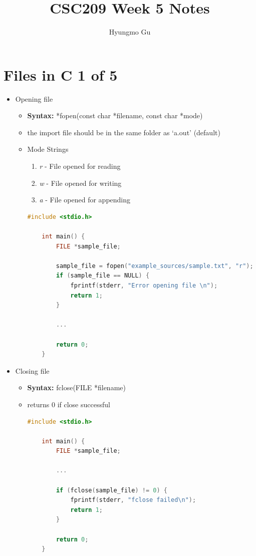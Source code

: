 \documentclass[12pt]{article}
\begin{document}
\title{CSC209 Week 5 Notes}
\author{Hyungmo Gu}
\maketitle

\section*{Files in C 1 of 5}

\bigskip

\begin{itemize}
    \item Opening file
    \begin{itemize}
        \item \textbf{Syntax:} *fopen(const char *filename, const char *mode)
        \item the import file should be in the same folder as `a.out' (default)
        \item Mode Strings
        \begin{enumerate}[1.]
            \item \textit{r} - File opened for reading
            \item \textit{w} - File opened for writing
            \item \textit{a} - File opened for appending
        \end{enumerate}

    \begin{lstlisting}[language=c]
    #include <stdio.h>

    int main() {
        FILE *sample_file;

        sample_file = fopen("example_sources/sample.txt", "r");
        if (sample_file == NULL) {
            fprintf(stderr, "Error opening file \n");
            return 1;
        }

        ...

        return 0;
    }
    \end{lstlisting}
    \end{itemize}
    \item Closing file
    \begin{itemize}
        \item \textbf{Syntax:} fclose(FILE *filename)
        \item returns 0 if close successful

    \begin{lstlisting}[language=c]
    #include <stdio.h>

    int main() {
        FILE *sample_file;

        ...

        if (fclose(sample_file) != 0) {
            fprintf(stderr, "fclose failed\n");
            return 1;
        }

        return 0;
    }
    \end{lstlisting}
    \end{itemize}
\end{itemize}
\end{document}
